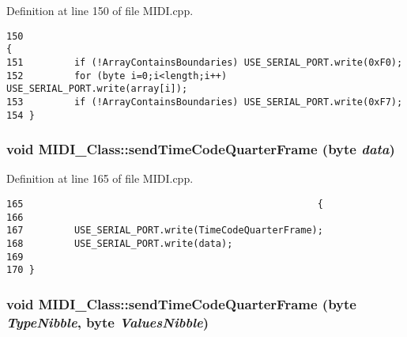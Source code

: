 Definition at line 150 of file MIDI.cpp.

\begin{Code}\begin{verbatim}150                                                                                   {
151         if (!ArrayContainsBoundaries) USE_SERIAL_PORT.write(0xF0);
152         for (byte i=0;i<length;i++) USE_SERIAL_PORT.write(array[i]);
153         if (!ArrayContainsBoundaries) USE_SERIAL_PORT.write(0xF7);
154 }
\end{verbatim}
\end{Code}


\hypertarget{class_m_i_d_i___class_1f720df72c5253d85d1d547d09357ea0}{
\subsubsection[{sendTimeCodeQuarterFrame}]{\setlength{\rightskip}{0pt plus 5cm}void MIDI\_\-Class::sendTimeCodeQuarterFrame (byte {\em data})}}
\label{class_m_i_d_i___class_1f720df72c5253d85d1d547d09357ea0}




Definition at line 165 of file MIDI.cpp.

\begin{Code}\begin{verbatim}165                                                    {
166         
167         USE_SERIAL_PORT.write(TimeCodeQuarterFrame);
168         USE_SERIAL_PORT.write(data);
169         
170 }
\end{verbatim}
\end{Code}


\hypertarget{class_m_i_d_i___class_d9b1bd53330652f0360a0a6ed80b5b9d}{
\subsubsection[{sendTimeCodeQuarterFrame}]{\setlength{\rightskip}{0pt plus 5cm}void MIDI\_\-Class::sendTimeCodeQuarterFrame (byte {\em TypeNibble}, \/  byte {\em ValuesNibble})}}
\label{class_m_i_d_i___class_d9b1bd53330652f0360a0a6ed80b5b9d}




